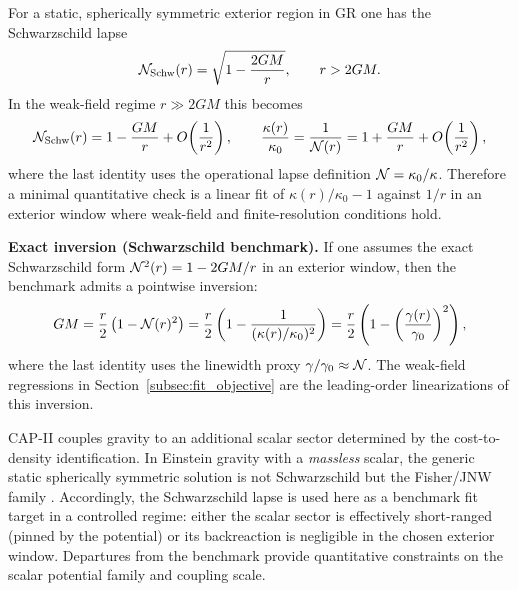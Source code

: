 For a static, spherically symmetric exterior region in GR one has the Schwarzschild lapse
\begin{equation}
  \mathcal{N}_{\mathrm{Schw}}(r)=\sqrt{1-\frac{2GM}{r}},
  \qquad r>2GM.
\end{equation}
In the weak-field regime $r\gg 2GM$ this becomes
\begin{equation}
  \mathcal{N}_{\mathrm{Schw}}(r)=1-\frac{GM}{r}+O\!\left(\frac{1}{r^2}\right),
  \qquad
  \frac{\kappa(r)}{\kappa_0}=\frac{1}{\mathcal{N}(r)}=1+\frac{GM}{r}+O\!\left(\frac{1}{r^2}\right),
  \label{eq:kappa_schw_weak}
\end{equation}
where the last identity uses the operational lapse definition $\mathcal{N}=\kappa_0/\kappa$.
Therefore a minimal quantitative check is a linear fit of $\kappa(r)/\kappa_0-1$ against $1/r$ in an exterior window where weak-field and finite-resolution conditions hold.
\par
\noindent\textbf{Exact inversion (Schwarzschild benchmark).}
If one assumes the exact Schwarzschild form $\mathcal{N}^2(r)=1-2GM/r$ in an exterior window, then the benchmark admits a pointwise inversion:
\begin{equation}
  GM
  = \frac{r}{2}\left(1-\mathcal{N}(r)^2\right)
  = \frac{r}{2}\left(1-\frac{1}{(\kappa(r)/\kappa_0)^2}\right)
  = \frac{r}{2}\left(1-\left(\frac{\gamma(r)}{\gamma_0}\right)^2\right),
\end{equation}
where the last identity uses the linewidth proxy $\gamma/\gamma_0\approx\mathcal{N}$.
The weak-field regressions in Section~\ref{subsec:fit_objective} are the leading-order linearizations of this inversion.
\begin{remark}
\label{rem:schwarzschild_as_benchmark}
CAP-II couples gravity to an additional scalar sector determined by the cost-to-density identification.
In Einstein gravity with a \emph{massless} scalar, the generic static spherically symmetric solution is not Schwarzschild but the Fisher/JNW family \cite{Fisher1948,JanisNewmanWinicour1968}.
Accordingly, the Schwarzschild lapse is used here as a benchmark fit target in a controlled regime: either the scalar sector is effectively short-ranged (pinned by the potential) or its backreaction is negligible in the chosen exterior window.
Departures from the benchmark provide quantitative constraints on the scalar potential family and coupling scale.
\end{remark}

